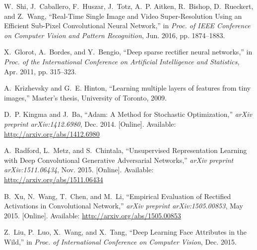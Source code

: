 \documentclass{article}
\begin{document}
\begin{thebibliography}{10}
\BIBentryALTinterwordspacing
W.~Shi, J.~Caballero, F.~Huszar, J.~Totz, A.~P. Aitken, R.~Bishop, D.~Rueckert,
  and Z.~Wang, ``{Real-Time Single Image and Video Super-Resolution Using an
  Efficient Sub-Pixel Convolutional Neural Network},'' in \emph{Proc. of
  IEEE Conference on Computer Vision and Pattern Recognition},
  Jun. 2016, pp. 1874--1883.
\BIBentrySTDinterwordspacing

X.~Glorot, A.~Bordes, and Y.~Bengio, ``{Deep sparse rectifier neural
  networks},'' in \emph{Proc. of the International Conference on
  Artificial Intelligence and Statistics}, Apr. 2011,
  pp. 315--323.

A.~Krizhevsky and G.~E. Hinton, ``{Learning multiple layers of features from
  tiny images},'' Master's thesis, University of Toronto, 2009.

\BIBentryALTinterwordspacing
D.~P. Kingma and J.~Ba, ``{Adam: A Method for Stochastic Optimization},''
  \emph{arXiv preprint arXiv:1412.6980}, Dec. 2014. [Online].
  Available: \url{http://arxiv.org/abs/1412.6980}
\BIBentrySTDinterwordspacing

\BIBentryALTinterwordspacing
A.~Radford, L.~Metz, and S.~Chintala, ``{Unsupervised Representation Learning
  with Deep Convolutional Generative Adversarial Networks},'' \emph{arXiv
  preprint arXiv:1511.06434}, Nov. 2015. [Online]. Available:
  \url{http://arxiv.org/abs/1511.06434}
\BIBentrySTDinterwordspacing

\BIBentryALTinterwordspacing
B.~Xu, N.~Wang, T.~Chen, and M.~Li, ``{Empirical Evaluation of Rectified
  Activations in Convolutional Network},'' \emph{arXiv preprint
  arXiv:1505.00853}, May 2015. [Online]. Available:
  \url{http://arxiv.org/abs/1505.00853}
\BIBentrySTDinterwordspacing

Z.~Liu, P.~Luo, X.~Wang, and X.~Tang, ``{Deep Learning Face Attributes in the
  Wild},'' in \emph{Proc. of International Conference on Computer
  Vision}, Dec. 2015.

\end{thebibliography}
 
\end{document}
